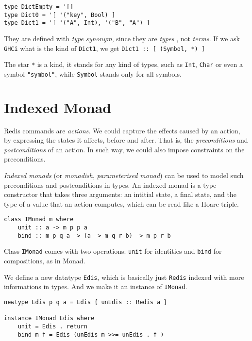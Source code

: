 \documentclass[pldi]{sigplanconf-pldi16}
\begin{document}
\begin{verbatim}
type DictEmpty = '[]
type Dict0 = '[ '("key", Bool) ]
type Dict1 = '[ '("A", Int), '("B", "A") ]
\end{verbatim}

They are defined with \emph{type synonym}, since they are \emph{types}
, not \emph{terms}. If we ask \texttt{GHCi} what is the kind of
\texttt{Dict1}, we get \texttt{Dict1 :: [ (Symbol, *) ]}

The star \texttt{*} is a kind, it stands for any kind of types,
such as \texttt{Int}, \texttt{Char} or even a symbol
\texttt{"symbol"}, while \texttt{Symbol} stands only
for all symbols.

\section{Indexed Monad}

Redis commands are \emph{actions}.
We could capture the effects caused by an action, by expressing the states it
affects, before and after. That is, the \emph{preconditions} and
\emph{postconditions} of an action. In such way, we could also impose
constraints on the preconditions.

\emph{Indexed monads} (or \emph{monadish},
\emph{parameterised monad})\cite{indexedmonad}
can be used\cite{typefun}\cite{staticresources} to model such preconditions and
postconditions in types. An indexed monad is a type constructor that takes three
arguments: an intitial state, a final state, and the type of a value that an
action computes, which can be read like a Hoare triple\cite{kleisli}.

\begin{verbatim}
class IMonad m where
    unit :: a -> m p p a
    bind :: m p q a -> (a -> m q r b) -> m p r b
\end{verbatim}

Class \texttt{IMonad} comes with two operations:
\texttt{unit} for identities and \texttt{bind} for
compositions, as in Monad.

We define a new datatype \texttt{Edis}, which is basically just
\texttt{Redis} indexed with more informations in types. And we make
 it an instance of \texttt{IMonad}.

\begin{verbatim}
newtype Edis p q a = Edis { unEdis :: Redis a }

instance IMonad Edis where
    unit = Edis . return
    bind m f = Edis (unEdis m >>= unEdis . f )
\end{verbatim}
\end{document}
